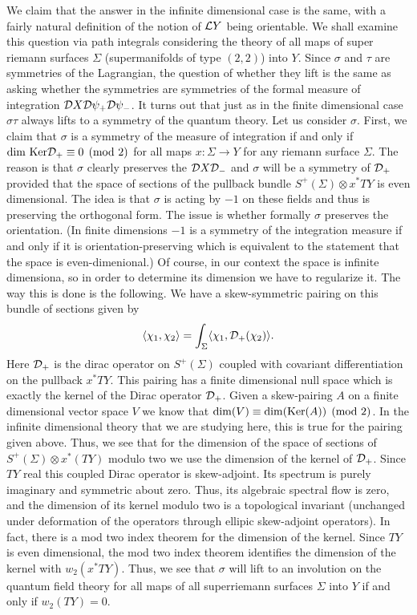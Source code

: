 We claim that the answer in the infinite dimensional case is the same,
with a fairly natural definition of the notion of ${\cal L}Y$ being
orientable. 
We shall examine this question via path integrals considering the
theory of all maps of super riemann surfaces $\Sigma$ (supermanifolds
of type $(2,2)$) into $Y$.
Since $\sigma$ and $\tau$ are symmetries of the Lagrangian, the
question of whether they lift is
the same as asking whether the symmetries are symmetries of the
formal measure of integration ${\cal D}X{\cal D}\psi_+{\cal D}\psi_-$.
It turns out that just as in the finite dimensional case  $\sigma\tau$
always lifts to a symmetry of the quantum theory.
Let us consider $\sigma$. 
First, we claim that $\sigma$ is a symmetry of the measure of integration
if and only if ${\rm dim}\ {\rm Ker}{\cal D}_+\equiv 0\pmod 2$
for all
maps $x\colon \Sigma\to Y$ for any riemann surface $\Sigma$.
The reason is that  $\sigma$ clearly preserves the ${\cal D}X{\cal
D}_-$ and $\sigma$ will be a symmetry of ${\cal D}_+$ provided that
the space of sections of the pullback bundle $S^+(\Sigma)\otimes x^*TY$
is even dimensional.
The idea is that $\sigma$ is acting by $-1$ on these fields and thus
is preserving the orthogonal form. The    issue is whether formally
$\sigma$ preserves the orientation.  (In finite dimensions $-1$ is a
symmetry of the integration measure if and only if it is
orientation-preserving which is equivalent to the statement that the
space is even-dimenional.)
Of course, in our context the space is  infinite dimensiona, so in
order to determine its dimension we have to regularize 
it. The way this is done is the following.  We have a 
skew-symmetric pairing on this bundle of sections given by 
$$\langle \chi_1,\chi_2\rangle=\int_\Sigma \langle
\chi_1,{\cal D_+}(\chi_2)\rangle.$$
Here ${\cal D}_+$ is the dirac operator on $S^+(\Sigma)$ coupled with
covariant differentiation on the pullback
$x^*TY$. 
This pairing has a finite dimensional null space which is exactly the
kernel of the Dirac operator ${\cal D}_+$.
Given a skew-pairing $A$ on a finite dimensional
vector space $V$ we know that ${\rm dim}(V)\equiv {\rm dim}({\rm
Ker}(A))\pmod 2$.
In the infinite dimensional theory that we are studying here, this is
true for the pairing given above.  Thus, we see that for the dimension
of the space of sections of $S^+(\Sigma)\otimes x^*(TY)$  modulo two
we use the dimension of the kernel of ${\cal D}_+$.
Since $TY$  real this coupled Dirac operator is skew-adjoint.
Its spectrum is purely imaginary and symmetric about zero.
Thus, its algebraic spectral flow is zero, and the dimension of its
kernel modulo two is a topological invariant (unchanged under
deformation of the operators through ellipic skew-adjoint operators).
In fact, there is a mod two index theorem for the dimension of the
kernel.  Since $TY$ is even 
dimensional, the mod two index theorem identifies the dimension of the
kernel with $w_2(x^*TY)$.
Thus, we see that $\sigma$ will lift to an involution on the quantum
field theory for all maps of all superriemann surfaces $\Sigma$ into
$Y$ if and only if $w_2(TY)=0$. 

